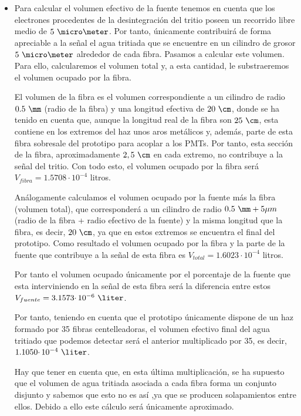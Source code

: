 \begin{itemize}
 \item{} Para calcular el volumen efectivo de la fuente tenemos en cuenta que los electrones procedentes de la desintegración del tritio poseen un recorrido libre medio de $5~\micro\meter$. Por tanto, únicamente contribuirá de forma apreciable a la señal el agua tritiada que se encuentre en  un cilindro de grosor $5~\micro\meter$ alrededor de cada fibra. Pasamos a calcular este volumen. Para ello, calcularemos el volumen total y, a esta cantidad, le substraeremos el volumen ocupado por la fibra.

El volumen de la fibra es el volumen correspondiente a un cilindro de radio $0.5~\mm$ (radio de la fibra) y una longitud efectiva de $20~\cm$, donde se ha tenido en cuenta que, aunque la longitud real de la fibra son $25~\cm$, esta contiene en los extremos del haz unos aros metálicos y, además, parte de esta fibra sobresale del prototipo para acoplar a los PMTs. Por tanto, esta sección de la fibra, aproximadamente $2,5~\cm$ en cada extremo,  no contribuye a la señal del tritio. Con todo esto, el volumen ocupado por la fibra será $V_{fibra}=1.5708 \cdotp 10^{-4}$ litros.

Análogamente calculamos el volumen ocupado por la fuente más la fibra (volumen total), que corresponderá a un cilindro de radio $0.5~\mm+5\mu m$ (radio de la fibra + radio efectivo de la fuente) y la misma longitud que la fibra, es decir, $20~\cm$, ya que en estos extremos se encuentra el final del prototipo. Como resultado el volumen ocupado por la fibra y la parte de la fuente que contribuye a la señal de esta fibra es $V_{total}=1.6023 \cdotp 10^{-4}$ litros. 

Por tanto el volumen ocupado únicamente por el porcentaje de la fuente que esta interviniendo en la señal de esta fibra será la diferencia entre estos $V_{fuente}=3.1573 \cdotp 10^{-6}~\liter$.
 
Por tanto, teniendo en cuenta que el prototipo únicamente dispone de un haz formado por 35 fibras centelleadoras, el volumen efectivo final del agua tritiado que podemos detectar será el anterior multiplicado por 35, es decir, $1.1050 \cdotp 10^{-4}~\liter$. 

Hay que tener en cuenta que, en esta última multiplicación, se ha supuesto que el volumen de agua tritiada asociada a cada fibra forma un conjunto disjunto y sabemos que esto no es así ,ya que se producen solapamientos entre ellos. Debido a ello este cálculo será únicamente aproximado.


\end{itemize}
